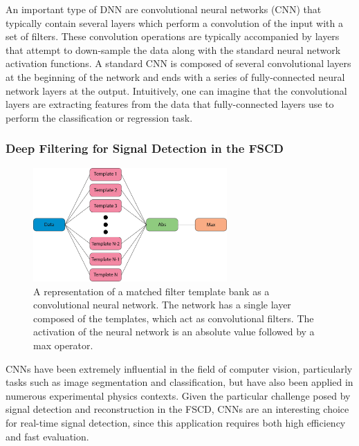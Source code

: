 An important type of DNN are convolutional neural networks (CNN) that typically contain several layers which perform a convolution of the input with a set of filters. These convolution operations are typically accompanied by layers that attempt to down-sample the data along with the standard neural network activation functions. A standard CNN is composed of several convolutional layers at the beginning of the network and ends with a series of fully-connected neural network layers at the output. Intuitively, one can imagine that the convolutional layers are extracting features from the data that fully-connected layers use to perform the classification or regression task.

\subsubsection*{Deep Filtering for Signal Detection in the FSCD}

\begin{figure}[htbp]
    \centering
    \includegraphics[width=0.66\textwidth]{figs/Chapter-4/230517_mf_conv_net.png}
    \caption{A representation of a matched filter template bank as a convolutional neural network. The network has a single layer composed of the templates, which act as convolutional filters. The activation of the neural network is an absolute value followed by a max operator.}
    \label{fig:chap4-mf-neural-network}
\end{figure}

CNNs have been extremely influential in the field of computer vision, particularly tasks such as image segmentation and classification, but have also been applied in numerous experimental physics contexts. Given the particular challenge posed by signal detection and reconstruction in the FSCD, CNNs are an interesting choice for real-time signal detection, since this application requires both high efficiency and fast evaluation.

